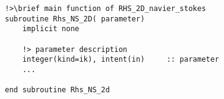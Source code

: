 \documentclass[11pt]{article}
\begin{document}
\begin{itemize}
\begin{lstlisting}
!>\brief main function of RHS_2D_navier_stokes
subroutine Rhs_NS_2D( parameter)
    implicit none

    !> parameter description
    integer(kind=ik), intent(in)     :: parameter 
    ...

end subroutine Rhs_NS_2d

\end{lstlisting}

\end{itemize}
\end{document}
